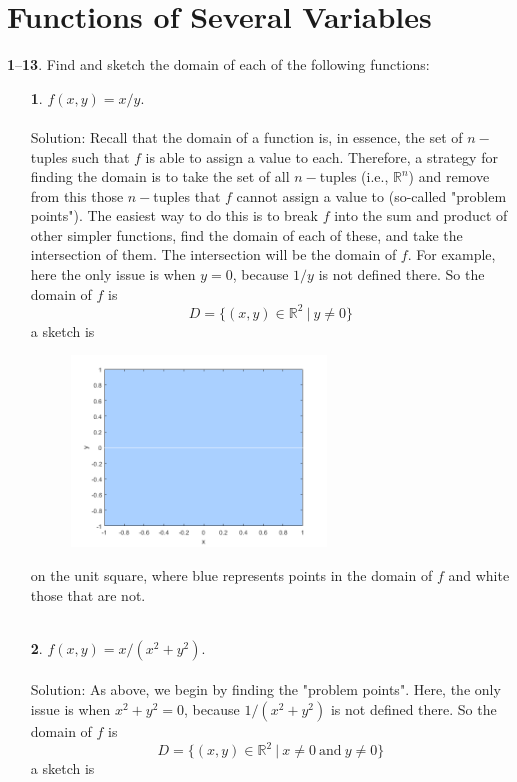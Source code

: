 \documentclass[12pt]{amsbook}
\begin{document}
\section{Functions of Several Variables}
\noindent
{\small {\bf 1}--{\bf 13}}. Find and sketch the domain of each of the following functions:
\begin{enumerate}
  \item[{\small\bf 1}.] $f(x,y)=x/y$.
  \\
  \\
  {\sc Solution}: Recall that the domain of a function is, in essence, the set of $n-$tuples such that $f$ is able to assign a value to each. Therefore, a strategy for finding the domain is to take the set of all $n-$tuples (i.e., $\mathbb{R}^n$) and remove from this those $n-$tuples that $f$ cannot assign a value to (so-called "problem points"). The easiest way to do this is to break $f$ into the sum and product of other simpler functions, find the domain of each of these, and take the intersection of them. The intersection will be the domain of $f$. For example, here the only issue is when $y=0$, because $1/y$ is not defined there. So the domain of $f$ is
  $$D=\{(x,y)\in \mathbb{R}^2 \ | \ y\neq 0 \}$$ 
  a sketch is
  \begin{center}
  \includegraphics[width=3.5in,height=2.0in]{3_1_1.png}
  \end{center}
  on the unit square, where blue represents points in the domain of $f$ and white those that are not. 
  \\
  \\
  \item[{\small\bf 2}.] $f(x,y)=x/(x^2+y^2)$.
  \\
  \\
  {\sc Solution}: As above, we begin by finding the "problem points". Here, the only issue is when $x^2+y^2=0$, because $1/(x^2+y^2)$ is not defined there. So the domain of $f$ is
  $$D=\{(x,y)\in \mathbb{R}^2 \ | \ x\neq 0 \ \text{and} \ y\neq 0  \}$$ 
  a sketch is
  \begin{center}

\end{center}
\end{enumerate}
\end{document}
